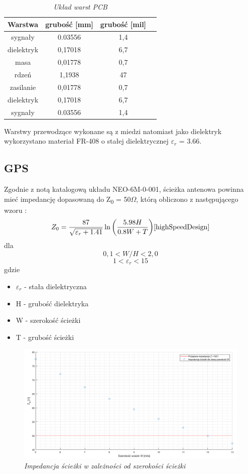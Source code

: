 \documentclass[eng,printmode]{mgr}
\begin{document}
\begin{table}[htb]
\def\arraystretch{1.3}%
\caption{\textit{ Układ warst PCB}}
\label{tab:pcbStack}
\begin{center}
\def\arraystretch{1.3}%
\begin{tabular}{ |c|c|c|c| }
\hline
Warstwa& grubość [mm] & grubość [mil] \\ 
\hline
sygnały & 0.03556 & 1,4 \\ 
\hline
dielektryk & 0,17018 & 6,7\\ 
\hline
masa & 0,01778 & 0,7\\ 
\hline
rdzeń & 1,1938 & 47\\ 
\hline
zasilanie & 0,01778 & 0,7\\ 
\hline
dielektryk & 0,17018 & 6,7\\ 
\hline
sygnały & 0.03556 & 1,4 \\ 
\hline
\end{tabular}
\end{center}
\end{table}

Warstwy przewodzące wykonane są z miedzi natomiast jako dielektryk wykorzystano materiał FR-408 o stałej dielektrycznej \textbf{$\varepsilon_r$} = 3.66.

\subsection*{GPS}
Zgodnie z notą katalogową układu NEO-6M-0-001, ścieżka antenowa powinna mieć impedancję dopasowaną do Z\textsubscript{0} = 50\textbf{$\Omega$}, którą obliczono z następującego wzoru :
\begin{equation}
Z_0= \frac{87}{\sqrt{\varepsilon_r + 1.41}}\ln{\left(\frac{5.98H}{0.8W + T}\right)} \label{eq:gps_z0} \cite{highSpeedDesign}
\end{equation}
dla 
$$
0,1 < W/H < 2,0
$$
$$
1 < \varepsilon_r < 15
$$
gdzie
\begin{itemize}
  \item \textbf{$\varepsilon_r$} - stała dielektryczna
  \item H - grubość dielektryka
  \item W - szerokość ścieżki
  \item T - grubość ścieżki
\end{itemize}
\newpage
\begin{figure}[!h]
    \centering
    \includegraphics[width=\textwidth]{plots/gpsZ0.png}
    \caption{\textit{ Impedancja ścieżki w zależności od szerokości ścieżki}}
\end{figure}
\end{document}

